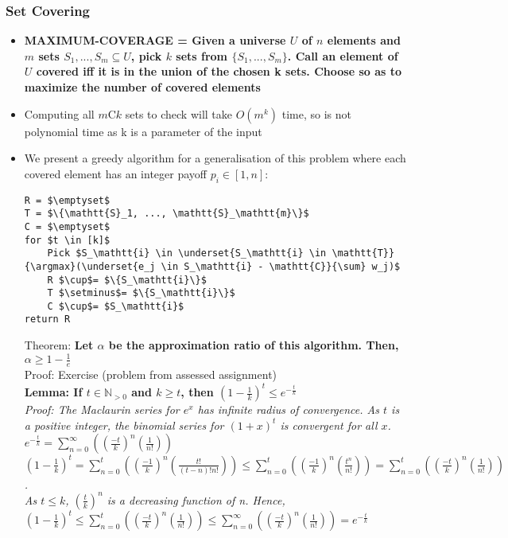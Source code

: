 \documentclass[20pt,a4paper,landscape]{extarticle}
\DeclareMathOperator*{\argmax}{arg\,max\:}
\begin{document}
\begin{flushleft}
\subsubsection{Set Covering}
\begin{itemize}
\item \textbf{MAXIMUM-COVERAGE = Given a universe $U$ of $n$ elements and $m$ sets $S_1, ..., S_m \subseteq U$, pick $k$ sets from $\{S_1, ..., S_m\}$. Call an element of $U$ covered iff it is in the union of the chosen k sets. Choose so as to maximize the number of covered elements}
\item Computing all $m\textrm{C}k$ sets to check will take $O(m^k)$ time, so is not polynomial time as k is a parameter of the input
\item We present a greedy algorithm for a generalisation of this problem where each covered element has an integer payoff $p_i \in [1, n]$:\\
\begin{lstlisting}
R = $\emptyset$
T = $\{\mathtt{S}_1, ..., \mathtt{S}_\mathtt{m}\}$
C = $\emptyset$
for $t \in [k]$
    Pick $S_\mathtt{i} \in \underset{S_\mathtt{i} \in \mathtt{T}}{\argmax}(\underset{e_j \in S_\mathtt{i} - \mathtt{C}}{\sum} w_j)$
    R $\cup$= $\{S_\mathtt{i}\}$
    T $\setminus$= $\{S_\mathtt{i}\}$
    C $\cup$= $S_\mathtt{i}$
return R
\end{lstlisting}
Theorem: \textbf{Let $\alpha$ be the approximation ratio of this algorithm. Then, $\alpha \geq 1 - \frac{1}{e}$}\\
Proof: Exercise (problem from assessed assignment)\\
\textbf{Lemma: If $t \in \mathbb{N}_{>0}$ and $k \geq t$, then $(1 - \frac{1}{k})^t \leq e^{-\frac{t}{k}}$}\\
\textit{Proof:
The Maclaurin series for $e^x$ has infinite radius of convergence. As $t$ is a positive integer, the binomial series for $(1+x)^{t}$ is convergent for all $x$.\\
$e^{-\frac{t}{k}} = \sum_{n=0}^{\infty}\left(\left(\frac{-t}{k}\right)^n\left(\frac{1}{n!}\right)\right)$\\
$\left(1 - \frac{1}{k}\right)^t = \sum_{n=0}^{t}\left(\left(\frac{-1}{k}\right)^n\left(\frac{t!}{(t-n)!n!}\right)\right) \leq \sum_{n=0}^{t}\left(\left(\frac{-1}{k}\right)^n\left(\frac{t^n}{n!}\right)\right) = \sum_{n=0}^{t}\left(\left(\frac{-t}{k}\right)^n\left(\frac{1}{n!}\right)\right)$.\\
As $t \leq k$, $\left(\frac{t}{k}\right)^n$ is a decreasing function of n. Hence, $\left(1 - \frac{1}{k}\right)^t \leq \sum_{n=0}^{t}\left(\left(\frac{-t}{k}\right)^n\left(\frac{1}{n!}\right)\right) \leq \sum_{n=0}^{\infty}\left(\left(\frac{-t}{k}\right)^n\left(\frac{1}{n!}\right)\right) = e^{-\frac{t}{k}}$}
\end{itemize}

\end{flushleft}
\end{document}
